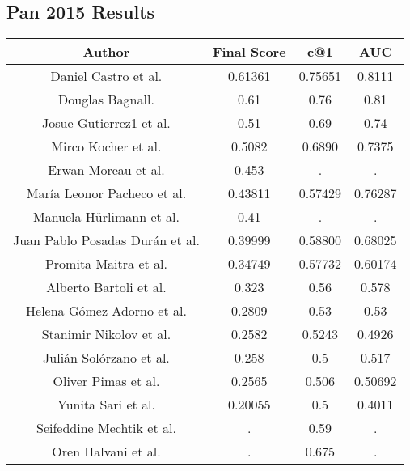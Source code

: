 \subsection{Pan 2015 Results} \label{subsec: Pan2015Res}



\begin{center}
\begin{tabular}{|c|c|c|c|}
\hline
\textbf{Author}          & \textbf{Final Score} & \textbf{c@1} & \textbf{AUC} \\ \hline
Daniel Castro et al. & 0.61361 & 0.75651 & 0.8111 \\ \hline
Douglas Bagnall. & 0.61 & 0.76 & 0.81 \\ \hline
Josue Gutierrez1 et al. & 0.51 & 0.69 & 0.74 \\ \hline
Mirco Kocher et al. & 0.5082 & 0.6890 & 0.7375 \\ \hline
Erwan Moreau et al. & 0.453 & . & . \\ \hline
María Leonor Pacheco et al. & 0.43811 & 0.57429 & 0.76287 \\ \hline
Manuela Hürlimann et al. & 0.41 & . & . \\ \hline
Juan Pablo Posadas Durán et al. & 0.39999 & 0.58800 & 0.68025 \\ \hline
Promita Maitra et al. & 0.34749  & 0.57732 & 0.60174 \\ \hline
Alberto Bartoli et al. & 0.323 & 0.56 & 0.578 \\ \hline
Helena Gómez Adorno et al. & 0.2809 & 0.53 & 0.53 \\ \hline
Stanimir Nikolov et al. & 0.2582 & 0.5243 & 0.4926 \\ \hline
Julián Solórzano et al. & 0.258 & 0.5 & 0.517 \\ \hline
Oliver Pimas et al. & 0.2565  & 0.506 & 0.50692 \\ \hline
Yunita Sari et al. & 0.20055 & 0.5 & 0.4011 \\ \hline
Seifeddine Mechtik et al. & .  & 0.59 & . \\ \hline
Oren Halvani et al. & . & 0.675 & . \\ \hline
\end{tabular}
\end{center}
